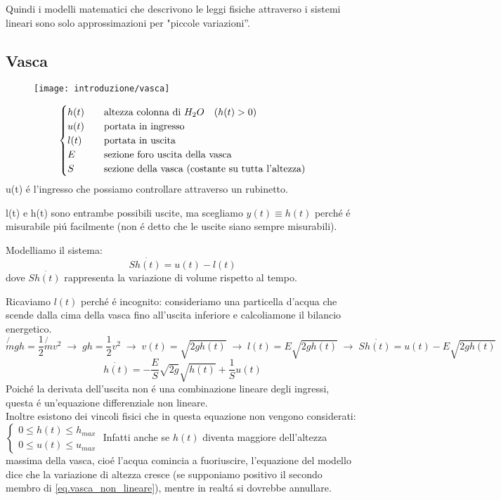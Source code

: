 \documentclass[../main.tex]{subfiles}
\begin{document}
		Quindi i modelli matematici che descrivono le leggi fisiche attraverso i sistemi lineari sono solo approssimazioni per "piccole variazioni''.
		
	\subsection{Vasca}
		\label{sec:vasca}
		
		\begin{figure}[H]
		\centering
		\texttt{[image: introduzione/vasca]}
		\end{figure}
	
		\[
			\begin{cases}
				h(t) & \quad \text{altezza colonna di $ H_{2}O $} \quad (h(t)>0)\\
				u(t) & \quad \text{portata in ingresso}\\
				l(t) & \quad \text{portata in uscita}\\
				E & \quad \text{sezione foro uscita della vasca}\\
				S & \quad \text{sezione della vasca (costante su tutta l'altezza)}
			\end{cases}
		\]
		u(t) \'e l'ingresso che possiamo controllare attraverso un rubinetto.
		
		l(t) e h(t) sono entrambe possibili uscite, ma scegliamo $y(t) \equiv h(t)$ perch\'e \'e misurabile pi\'u facilmente (non \'e detto che le uscite siano sempre misurabili).
		
		Modelliamo il sistema:
		\begin{equation}
			S \dot{h(t)} = u(t) - l(t)
		\end{equation}
		dove $S \dot{h(t)}$ rappresenta la variazione di volume rispetto al tempo.
		
		Ricaviamo $l(t)$ perch\'e \'e incognito: consideriamo una particella d'acqua che scende dalla cima della vasca fino all'uscita inferiore e calcoliamone il bilancio energetico.
		\[
			\not{m} gh = \frac{1}{2} \not{m} v^2 \; \rightarrow \;
			gh = \frac{1}{2} v^2 \; \rightarrow \;
			v(t) = \sqrt{2gh(t)} \; \rightarrow \;
			l(t) = E \sqrt{2gh(t)} \; \rightarrow \;
			S \dot{h(t)} = u(t) - E \sqrt{2gh(t)}
		\]
		\begin{equation} \label{eq.vasca_non_lineare}
			\dot{h(t)} = - \frac{E}{S} \sqrt{2g} \sqrt{h(t)} + \frac{1}{S} u(t)
		\end{equation}
		Poich\'e la derivata dell'uscita non \'e una combinazione lineare degli ingressi, questa \'e un'equazione differenziale non lineare.\\
		Inoltre esistono dei vincoli fisici che in questa equazione non vengono considerati: 
		\(
			\begin{cases}
				0 \leq h(t) \leq h_{max}\\
				0 \leq u(t) \leq u_{max}
			\end{cases}
		\)
		Infatti anche se $h(t)$ diventa maggiore dell'altezza massima della vasca, cio\'e l'acqua comincia a fuoriuscire, l'equazione del modello dice che la variazione di altezza cresce (se supponiamo positivo il secondo membro di \ref{eq.vasca_non_lineare}), mentre in realt\'a si dovrebbe annullare.
		
\end{document}
